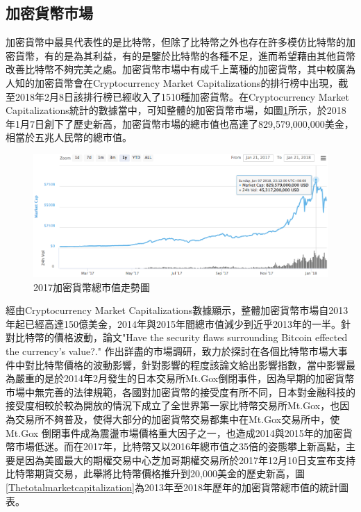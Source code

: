 		

		\subsection{加密貨幣市場}

		加密貨幣中最具代表性的是比特幣，但除了比特幣之外也存在許多模仿比特幣的加密貨幣，有的是為其利益，有的是鑒於比特幣的各種不足，進而希望藉由其他貨幣改善⽐特幣不夠完美之處。加密貨幣市場中有成千上萬種的加密貨幣，其中較廣為人知的加密貨幣會在Cryptocurrency Market Capitalizations\supercite{CryptocurrencyMarketCapitalizations}的排行榜中出現，截至2018年2月8日該排行榜已經收入了1510種加密貨幣。在Cryptocurrency Market Capitalizations統計的數據當中，可知整體的加密貨幣市場，如圖\ref{TotalMarketCapitalization}所示，於2018年1月7日創下了歷史新高，加密貨幣市場的總市值也高達了829,579,000,000美金，相當於五兆人民幣的總市值。

		\begin{figure}[htbp]
			\centering
			\includegraphics[width = .9\textwidth]{TotalMarketCapitalization.png}
			\caption{2017加密貨幣總市值走勢圖\supercite{CryptocurrencyMarketCapitalizations}}\label{TotalMarketCapitalization}
		\end{figure}

		經由Cryptocurrency Market Capitalizations數據顯示，整體加密貨幣市場自2013年起已經高達150億美金，2014年與2015年間總市值減少到近乎2013年的一半。針對比特幣的價格波動，論文"Have the security flaws surrounding Bitcoin effected the currency's value?."
		\supercite{HavethesecurityflawssurroundingBITCOINeffectedthecurrencysvalue?}
		作出詳盡的市場調研，致力於探討在各個比特幣市場大事件中對比特幣價格的波動影響，針對影響的程度該論文給出影響指數，當中影響最為嚴重的是於2014年2月發生的日本交易所Mt.Gox倒閉事件，因為早期的加密貨幣市場中無完善的法律規範，各國對加密貨幣的接受度有所不同，日本對金融科技的接受度相較於較為開放的情況下成立了全世界第一家比特幣交易所Mt.Gox，也因為交易所不夠普及，使得大部分的加密貨幣交易都集中在Mt.Gox交易所中，使Mt.Gox 倒閉事件成為震盪市場價格重⼤因⼦之⼀，也造成2014與2015年的加密貨幣市場低迷。而在2017年，比特幣又以2016年總市值之35倍的姿態攀上新高點，主要是因為美國最大的期權交易中心芝加哥期權交易所於2017年12月10日支宣布支持比特幣期貨交易，此舉將比特幣價格推升到20,000美金的歷史新高，圖\ref{Thetotalmarketcapitalization}為2013年至2018年歷年的加密貨幣總市值的統計圖表。

